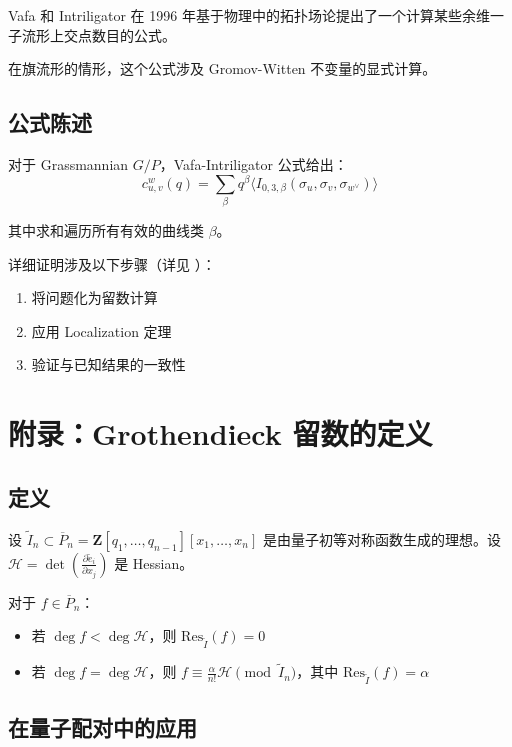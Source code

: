Vafa 和 Intriligator 在 1996 年基于物理中的拓扑场论提出了一个计算某些余维一子流形上交点数目的公式。

在旗流形的情形，这个公式涉及 Gromov-Witten 不变量的显式计算。

\subsection*{公式陈述}

对于 Grassmannian $G/P$，Vafa-Intriligator 公式给出：
$$c_{u,v}^w(q) = \sum_{\beta} q^\beta \langle I_{0,3,\beta}(\sigma_u, \sigma_v, \sigma_{w^\vee}) \rangle$$

其中求和遍历所有有效的曲线类 $\beta$。

详细证明涉及以下步骤（详见 \cite[ Section 8]{KM}）：
\begin{enumerate}
\item 将问题化为留数计算
\item 应用 Localization 定理
\item 验证与已知结果的一致性
\end{enumerate}

\section{附录：Grothendieck 留数的定义}
\label{sec:grothendieck-residue}

\subsection*{定义}

设 $\widetilde{I}_n \subset \overline{P}_n = \mathbf{Z}[q_1,\ldots,q_{n-1}][x_1,\ldots,x_n]$ 是由量子初等对称函数生成的理想。设 $\mathcal{H} = \det\left(\frac{\partial \widetilde{e}_i}{\partial x_j}\right)$ 是 Hessian。

对于 $f \in \overline{P}_n$：
\begin{itemize}
\item 若 $\deg f < \deg \mathcal{H}$，则 $\mathrm{Res}_{\widetilde{I}}(f) = 0$
\item 若 $\deg f = \deg \mathcal{H}$，则 $f \equiv \frac{\alpha}{n!}\mathcal{H} \pmod{\widetilde{I}_n}$，其中 $\mathrm{Res}_{\widetilde{I}}(f) = \alpha$
\end{itemize}

\subsection*{在量子配对中的应用}

